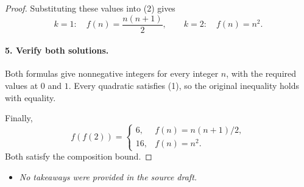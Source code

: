 \begin{dlsummary}[title={\bfseries Solution 55. The Reversible Difference},breakable]
\begin{proof}
Substituting these values into (2) gives
\[
k=1:\quad f(n)=\frac{n(n+1)}2,
\qquad
k=2:\quad f(n)=n^2.
\]

\paragraph{5. Verify both solutions.}

Both formulas give nonnegative integers for every integer \(n\), with the required values at \(0\) and \(1\). Every quadratic satisfies (1), so the original inequality holds with equality.

Finally,
\[
f(f(2))=
\begin{cases}
6,&f(n)=n(n+1)/2,\\
16,&f(n)=n^2.
\end{cases}
\]
Both satisfy the composition bound.
\end{proof}
\end{dlsummary}

\begin{takeaways}
\begin{itemize}
\item \emph{No takeaways were provided in the source draft.}
\end{itemize}
\end{takeaways}
